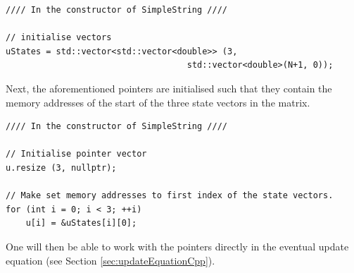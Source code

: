\setlstCpp
\begin{lstlisting}[belowskip=-0.5\baselineskip]
//// In the constructor of SimpleString ////

// initialise vectors
uStates = std::vector<std::vector<double>> (3, 
                                    std::vector<double>(N+1, 0));
\end{lstlisting}
%
Next, the aforementioned pointers are initialised such that they contain the memory addresses of the start of the three state vectors in the matrix.
\\
\noindent
\begin{minipage}{\textwidth}
\begin{lstlisting}[belowskip=-0.5\baselineskip]
//// In the constructor of SimpleString ////

// Initialise pointer vector
u.resize (3, nullptr);

// Make set memory addresses to first index of the state vectors.
for (int i = 0; i < 3; ++i)
    u[i] = &uStates[i][0];
\end{lstlisting}
\end{minipage}
One will then be able to work with the pointers directly in the eventual update equation (see Section \ref{sec:updateEquationCpp}).
    
